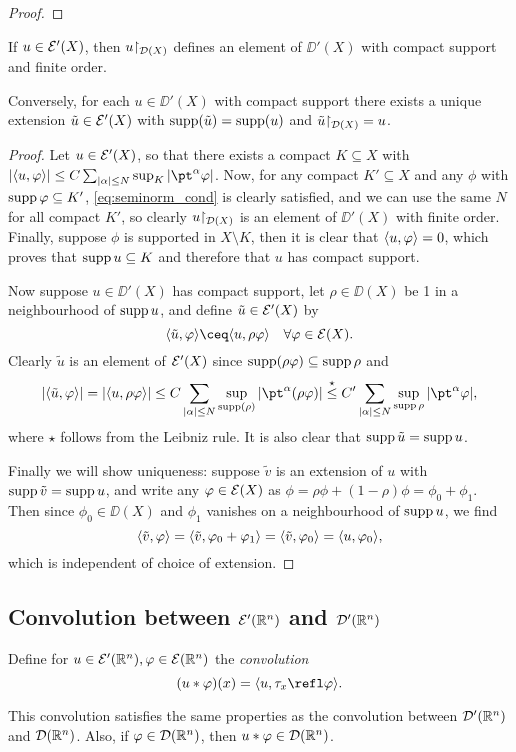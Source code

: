 \begin{proof}
	\TODO
\end{proof}

\begin{lemma}
	If $u \in \mathcal E'(X)$, then $u\mathord\restriction_{\mathcal D(X)}$ defines an element of $\DD'(X)$ with compact support and finite order. 
	
	Conversely, for each $u \in \DD'(X)$ with compact support there exists a unique extension $\tilde u \in \mathcal E'(X)$ with $\operatorname{supp}(\tilde u) = \operatorname{supp}(u)$ and $\tilde u\mathord\restriction_{\mathcal D(X)} = u$. 
\end{lemma}

\begin{proof}
	Let $u \in \mathcal E'(X)$, so that there exists a compact $K \subseteq X$ with $\abs{\ang{u, \phi}} \leq C \sum_{\abs{\alpha} \leq N} \sup_K \abs{\pt^\alpha \phi}$. 
	Now, for any compact $K' \subseteq X$ and any $\phi$ with $\operatorname{supp}\varphi \subseteq K'$, \cref{eq:seminorm_cond} is clearly satisfied, and we can use the same $N$ for all compact $K'$, so clearly $u\mathord\restriction_{\mathcal D(X)}$ is an element of $\DD'(X)$ with finite order.
	Finally, suppose $\phi$ is supported in $X \setminus K$, then it is clear that $\langle u, \varphi\rangle = 0$, which proves that $\operatorname{supp} u \subseteq K$ and therefore that $u$ has compact support.
	
	Now suppose $u \in \DD'(X)$ has compact support, let $\rho \in \DD(X)$ be 1 in a neighbourhood of $\operatorname{supp} u$, and define $\tilde u \in \mathcal E'(X)$ by
	\[
	\ang{\tilde u, \phi} \ceq \ang{u, \rho\phi} \quad\forall \phi \in \EE(X). 
	\]
	Clearly $\tilde u$ is an element of $\mathcal E'(X)$ since $\operatorname{supp}(\rho\varphi) \subseteq \operatorname{supp}\rho$ and 
	\[
	\abs{\ang{\tilde u, \phi}} = \abs{\ang{u, \rho\phi}} \leq C \sum_{\abs{\alpha} \leq N} \sup_{\supp(\rho)} \abs{\pt^\alpha(\rho \phi)} \overset\star\leq C' \sum_{\abs{\alpha} \leq N} \sup_{\supp\rho} \abs{\pt^\alpha\phi},
	\]
	where $\star$ follows from the Leibniz rule. It is also clear that $\operatorname{supp} \tilde u = \operatorname{supp} u$. 
	
	Finally we will show uniqueness: suppose $\tilde v$ is an extension of $u$ with $\operatorname{supp} \tilde v = \operatorname{supp} u$, and write any $\varphi \in \mathcal E(X)$ as $\phi = \rho\phi + (1-\rho)\phi = \phi_0 + \phi_1$. Then since $\phi_0 \in \DD(X)$ and $\phi_1$ vanishes on a neighbourhood of $\operatorname{supp} u$, we find
	\[
	\langle\tilde v, \varphi\rangle = \langle\tilde v, \varphi_0 + \varphi_1\rangle = \langle\tilde v, \varphi_0\rangle = \langle u, \varphi_0\rangle,
	\]
	which is independent of choice of extension. 
\end{proof}

\subsection{Convolution between $\mathcal E'(\mathbb R^n)$ and $\mathcal D'(\mathbb R^n)$}
\begin{definition}
	Define for $u \in \mathcal E'(\mathbb R^n), \varphi \in \mathcal E(\mathbb R^n)$ the \emph{convolution}
	\[
	(u * \phi)(x) = \ang{u, \tau_x \refl\phi}. 
	\]
\end{definition}
This convolution satisfies the same properties as the convolution between $\mathcal D'(\mathbb R^n)$ and $\mathcal D(\mathbb R^n)$. 
Also, if $\varphi \in \mathcal D(\mathbb R^n)$, then $u * \varphi \in \mathcal D(\mathbb R^n)$. 

